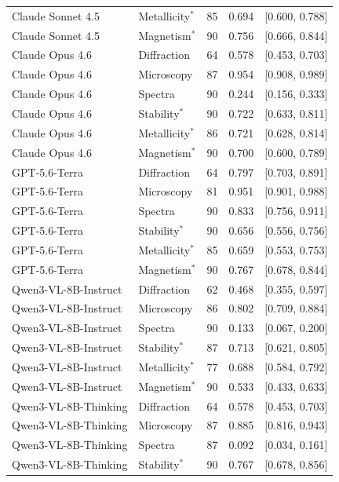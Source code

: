 \documentclass[11pt]{article}
\begin{document}
\begin{table}[h]
{\begin{tabular}{l l S[table-format=3.0] S[table-format=1.3] c}
Claude Sonnet 4.5 & Metallicity$^{*}$ & 85 & 0.694 & [0.600, 0.788] \\
Claude Sonnet 4.5 & Magnetism$^{*}$ & 90 & 0.756 & [0.666, 0.844] \\
\addlinespace
Claude Opus 4.6 & Diffraction & 64 & 0.578 & [0.453, 0.703] \\
Claude Opus 4.6 & Microscopy & 87 & 0.954 & [0.908, 0.989] \\
Claude Opus 4.6 & Spectra & 90 & 0.244 & [0.156, 0.333] \\
Claude Opus 4.6 & Stability$^{*}$ & 90 & 0.722 & [0.633, 0.811] \\
Claude Opus 4.6 & Metallicity$^{*}$ & 86 & 0.721 & [0.628, 0.814] \\
Claude Opus 4.6 & Magnetism$^{*}$ & 90 & 0.700 & [0.600, 0.789] \\
\addlinespace
GPT-5.6-Terra & Diffraction & 64 & 0.797 & [0.703, 0.891] \\
GPT-5.6-Terra & Microscopy & 81 & 0.951 & [0.901, 0.988] \\
GPT-5.6-Terra & Spectra & 90 & 0.833 & [0.756, 0.911] \\
GPT-5.6-Terra & Stability$^{*}$ & 90 & 0.656 & [0.556, 0.756] \\
GPT-5.6-Terra & Metallicity$^{*}$ & 85 & 0.659 & [0.553, 0.753] \\
GPT-5.6-Terra & Magnetism$^{*}$ & 90 & 0.767 & [0.678, 0.844] \\
\addlinespace
Qwen3-VL-8B-Instruct & Diffraction & 62 & 0.468 & [0.355, 0.597] \\
Qwen3-VL-8B-Instruct & Microscopy & 86 & 0.802 & [0.709, 0.884] \\
Qwen3-VL-8B-Instruct & Spectra & 90 & 0.133 & [0.067, 0.200] \\
Qwen3-VL-8B-Instruct & Stability$^{*}$ & 87 & 0.713 & [0.621, 0.805] \\
Qwen3-VL-8B-Instruct & Metallicity$^{*}$ & 77 & 0.688 & [0.584, 0.792] \\
Qwen3-VL-8B-Instruct & Magnetism$^{*}$ & 90 & 0.533 & [0.433, 0.633] \\
\addlinespace
Qwen3-VL-8B-Thinking & Diffraction & 64 & 0.578 & [0.453, 0.703] \\
Qwen3-VL-8B-Thinking & Microscopy & 87 & 0.885 & [0.816, 0.943] \\
Qwen3-VL-8B-Thinking & Spectra & 87 & 0.092 & [0.034, 0.161] \\
Qwen3-VL-8B-Thinking & Stability$^{*}$ & 90 & 0.767 & [0.678, 0.856] \\

\end{tabular}}
\end{table}
\end{document}
